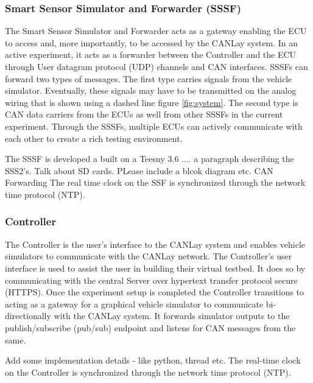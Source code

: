 \documentclass[letterpaper,twocolumn,12pt]{article}
\begin{document}
\subsubsection{Smart Sensor Simulator and Forwarder (SSSF)}
The Smart Sensor Simulator and Forwarder acts as a gateway enabling the ECU to access and, more importantly, to be accessed by the CANLay system. In an active experiment, it acts as a forwarder between the Controller and the ECU through User datagram protocol (UDP) channels and CAN interfaces. SSSFs can forward two types of messages. 
The first type carries signals from the vehicle simulator. Eventually, these signals may have to be transmitted on the analog wiring that is shown using a dashed line figure \ref{fig:system}.  
The second type is CAN data carriers from the ECUs as well from other SSSFs in the current experiment. Through the SSSFs, multiple ECUs can actively communicate with each other to create a rich testing environment.

The SSSF is developed a built on a Teesny 3.6 .... a paragraph describing the SSS2's. Talk about SD cards. PLease include a blcok diagram etc.
CAN Forwarding 
The real time clock on the SSF is synchronized through the network time protocol (NTP).

\subsubsection{Controller}
The Controller is the user's interface to the CANLay system and enables vehicle simulators to communicate with the CANLay network. The Controller’s user interface is used to assist the user in building their virtual testbed. 
It does so by communicating with the central Server over hypertext transfer protocol secure (HTTPS). 
Once the experiment setup is completed the Controller transitions to acting as a gateway for a graphical vehicle simulator to communicate bi-directionally with the CANLay system. It forwards simulator outputs to the publish/subscribe (pub/sub) endpoint and listens for CAN messages from the same.

Add some implementation details - like python, thread etc.
The real-time clock on the Controller is synchronized through the network time protocol (NTP).
\end{document}

